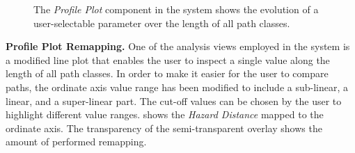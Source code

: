 \begin{figure}
\centering
{}
\caption{The \emph{Profile Plot} component in the system shows the evolution of a user-selectable parameter over the length of all path classes.}
\label{contributions:usar:rendering:profile}
\end{figure}

\textbf{Profile Plot Remapping.}  One of the analysis views employed in the system is a modified line plot that enables the user to inspect a single value along the length of all path classes.  In order to make it easier for the user to compare paths, the ordinate axis value range has been modified to include a sub-linear, a linear, and a super-linear part.  The cut-off values can be chosen by the user to highlight different value ranges.   shows the \emph{Hazard Distance} mapped to the ordinate axis.  The transparency of the semi-transparent overlay shows the amount of performed remapping.


